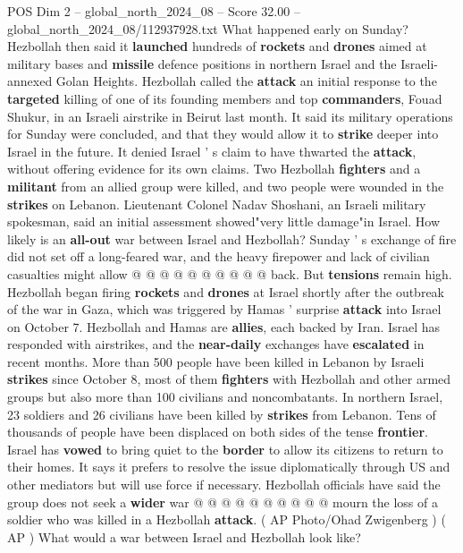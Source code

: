 \begin{textsample}{POS Dim 2 – global\_north\_2024\_08 – Score 32.00 – global\_north\_2024\_08/112937928.txt}  \label{ex:f2_pos_082}
What happened early on Sunday?
Hezbollah then said it \textbf{launched} hundreds of \textbf{rockets} and \textbf{drones} aimed at military bases and \textbf{missile} defence positions in northern Israel and the Israeli-annexed Golan Heights.
Hezbollah called the \textbf{attack} an initial response to the \textbf{targeted} killing of one of its founding members and top \textbf{commanders}, Fouad Shukur, in an Israeli airstrike in Beirut last month.
It said its military operations for Sunday were concluded, and that they would allow it to \textbf{strike} deeper into Israel in the future.
It denied Israel ' s claim to have thwarted the \textbf{attack}, without offering evidence for its own claims.
Two Hezbollah \textbf{fighters} and a \textbf{militant} from an allied group were killed, and two people were wounded in the \textbf{strikes} on Lebanon.
Lieutenant Colonel Nadav Shoshani, an Israeli military spokesman, said an initial assessment showed"very little damage"in Israel.
How likely is an \textbf{all-out} war between Israel and Hezbollah?
Sunday ' s exchange of fire did not set off a long-feared war, and the heavy firepower and lack of civilian casualties might allow @ @ @ @ @ @ @ @ @ @ back.
But \textbf{tensions} remain high.
Hezbollah began firing \textbf{rockets} and \textbf{drones} at Israel shortly after the outbreak of the war in Gaza, which was triggered by Hamas ' surprise \textbf{attack} into Israel on October 7.
Hezbollah and Hamas are \textbf{allies}, each backed by Iran.
Israel has responded with airstrikes, and the \textbf{near-daily} exchanges have \textbf{escalated} in recent months.
More than 500 people have been killed in Lebanon by Israeli \textbf{strikes} since October 8, most of them \textbf{fighters} with Hezbollah and other armed groups but also more than 100 civilians and noncombatants.
In northern Israel, 23 soldiers and 26 civilians have been killed by \textbf{strikes} from Lebanon.
Tens of thousands of people have been displaced on both sides of the tense \textbf{frontier}.
Israel has \textbf{vowed} to bring quiet to the \textbf{border} to allow its citizens to return to their homes.
It says it prefers to resolve the issue diplomatically through US and other mediators but will use force if necessary.
Hezbollah officials have said the group does not seek a \textbf{wider} war @ @ @ @ @ @ @ @ @ @ mourn the loss of a soldier who was killed in a Hezbollah \textbf{attack}. ( AP Photo/Ohad Zwigenberg ) ( AP ) What would a war between Israel and Hezbollah look like?

\end{textsample}
